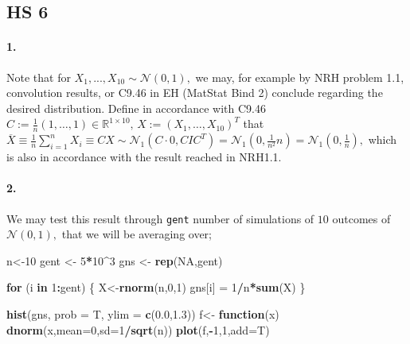 \documentclass[
]{article}
\newenvironment{Shaded}{\begin{snugshade}}{\end{snugshade}}
\newcommand{\ControlFlowTok}[1]{\textcolor[rgb]{0.13,0.29,0.53}{\textbf{#1}}}
\newcommand{\DataTypeTok}[1]{\textcolor[rgb]{0.13,0.29,0.53}{#1}}
\newcommand{\DecValTok}[1]{\textcolor[rgb]{0.00,0.00,0.81}{#1}}
\newcommand{\FloatTok}[1]{\textcolor[rgb]{0.00,0.00,0.81}{#1}}
\newcommand{\KeywordTok}[1]{\textcolor[rgb]{0.13,0.29,0.53}{\textbf{#1}}}
\newcommand{\NormalTok}[1]{#1}
\newcommand{\OperatorTok}[1]{\textcolor[rgb]{0.81,0.36,0.00}{\textbf{#1}}}
\newcommand{\OtherTok}[1]{\textcolor[rgb]{0.56,0.35,0.01}{#1}}
\newcommand{\StringTok}[1]{\textcolor[rgb]{0.31,0.60,0.02}{#1}}
\begin{document}
\hypertarget{hs-6}{%
\subsection{HS 6}\label{hs-6}}

\hypertarget{section-23}{%
\paragraph{\texorpdfstring{\textbf{1.}}{1.}}\label{section-23}}

Note that for \(X_1,...,X_{10} \sim\mathcal{N}(0,1),\) we may, for
example by NRH problem 1.1, convolution results, or C9.46 in EH (MatStat
Bind 2) conclude regarding the desired distribution. Define in
accordance with C9.46
\(C:=\frac{1}{n}\left({1,\ldots,1}\right)\in\mathbb{R}^{1\times10},\,X:=\left({X_1,\ldots,X_{10}}\right)^T\)
that
\(\overline{X}\equiv\frac{1}{n}\sum_{i=1}^{n}{X_i}\equiv CX \sim \mathcal{N}_1(C\cdot0,CIC^T)=\mathcal{N}_1(0,\frac{1}{n^2}n)=\mathcal{N_1}(0,\frac{1}{n}),\)
which is also in accordance with the result reached in NRH1.1.

\hypertarget{section-24}{%
\paragraph{\texorpdfstring{\textbf{2.}}{2.}}\label{section-24}}

We may test this result through \texttt{gent} number of simulations of
\(10\) outcomes of \(\mathcal{N}(0,1),\) that we will be averaging over;

\begin{Shaded}
\begin{Highlighting}[]
\NormalTok{n<-}\DecValTok{10}
\NormalTok{gent <-}\StringTok{ }\DecValTok{5}\OperatorTok{*}\DecValTok{10}\OperatorTok{^}\DecValTok{3}
\NormalTok{gns <-}\StringTok{ }\KeywordTok{rep}\NormalTok{(}\OtherTok{NA}\NormalTok{,gent)}

\ControlFlowTok{for}\NormalTok{ (i }\ControlFlowTok{in} \DecValTok{1}\OperatorTok{:}\NormalTok{gent) \{}
\NormalTok{  X<-}\KeywordTok{rnorm}\NormalTok{(n,}\DecValTok{0}\NormalTok{,}\DecValTok{1}\NormalTok{)}
\NormalTok{  gns[i] =}\StringTok{ }\DecValTok{1}\OperatorTok{/}\NormalTok{n}\OperatorTok{*}\KeywordTok{sum}\NormalTok{(X)}
\NormalTok{\}}

\KeywordTok{hist}\NormalTok{(gns, }\DataTypeTok{prob =}\NormalTok{ T, }\DataTypeTok{ylim =} \KeywordTok{c}\NormalTok{(}\FloatTok{0.0}\NormalTok{,}\FloatTok{1.3}\NormalTok{))}
\NormalTok{f<-}\StringTok{ }\ControlFlowTok{function}\NormalTok{(x) }\KeywordTok{dnorm}\NormalTok{(x,}\DataTypeTok{mean=}\DecValTok{0}\NormalTok{,}\DataTypeTok{sd=}\DecValTok{1}\OperatorTok{/}\KeywordTok{sqrt}\NormalTok{(n)) }
\KeywordTok{plot}\NormalTok{(f,}\OperatorTok{-}\DecValTok{1}\NormalTok{,}\DecValTok{1}\NormalTok{,}\DataTypeTok{add=}\NormalTok{T)}
\end{Highlighting}
\end{Shaded}
\end{document}

